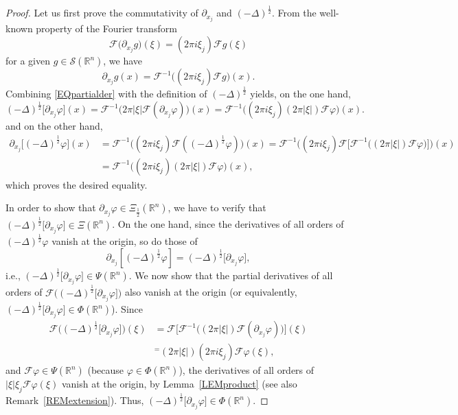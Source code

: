 \documentclass[reqno,11pt]{amsart}
\theoremstyle{definition}
\def\R{\mathbb{R}}
\begin{document}
\begin{proof}
	Let us first prove the commutativity of $\partial_{x_j}$ and $(-\Delta)^{\frac{1}{2}}$. From the well-known property of the Fourier transform
	\[
	\mathcal{F} \big(\partial_{x_j}g\big)(\xi) = (2\pi i \xi_j)\mathcal{F}g(\xi)
	\] for a given $g\in \mathcal{S}(\R^n)$, we have
	\begin{equation}
		\label{EQpartialder}
		\partial_{x_j}g(x) = \mathcal{F}^{-1}\big( (2\pi i \xi_j) \mathcal{F}g\big)(x).
	\end{equation}
	Combining \eqref{EQpartialder} with the definition of $(-\Delta)^\frac{1}{2}$ yields, on the one hand,
	\[
	(-\Delta)^{\frac{1}{2}}\big[\partial_{x_j}\varphi\big](x) = \mathcal{F}^{-1}\big(2 \pi |\xi| \mathcal{F}(\partial_{x_j}\varphi)\big)(x) = \mathcal{F}^{-1}\big( (2\pi i \xi_j)(2 \pi |\xi|)  \mathcal{F}\varphi\big)(x).
	\]
	and on the other hand,
	\begin{align*}
		\partial_{x_j}\big[(-\Delta)^{\frac{1}{2}}\varphi\big](x)&=\mathcal{F}^{-1}\big( (2\pi i \xi_j) \mathcal{F}((-\Delta)^{\frac{1}{2}}\varphi)\big)(x) = \mathcal{F}^{-1}\big( (2\pi i \xi_j) \mathcal{F}\big[\mathcal{F}^{-1}\big( (2 \pi |\xi|) \mathcal{F}\varphi \big)\big]\big)(x)\\
		&= \mathcal{F}^{-1}\big( (2\pi i \xi_j) (2 \pi |\xi|)\mathcal{F}\varphi \big)(x),
	\end{align*}
	which proves the desired equality.
	
	In order to show that $\partial_{x_j} \varphi\in \Xi_{{\frac{1}{2}}}(\R^n)$, we have to verify that $(-\Delta)^{\frac{1}{2}}\big[\partial_{x_j}\varphi\big]  \in \Xi(\R^n)$. On the one hand, since the derivatives of all orders of $(-\Delta)^{\frac{1}{2}} \varphi$ vanish at the origin, so do those of
\[
\partial_{x_j}[ (-\Delta)^{\frac{1}{2}} \varphi]=(-\Delta)^{\frac{1}{2}}\big[\partial_{x_j}\varphi\big],
\]
 i.e., $(-\Delta)^{\frac{1}{2}}\big[\partial_{x_j}\varphi\big]\in \Psi(\R^n)$. We now show that the partial derivatives of all orders of $\mathcal{F}\big((-\Delta)^{\frac{1}{2}}\big[\partial_{x_j}\varphi\big]\big)$ also vanish at the origin (or equivalently, $(-\Delta)^{\frac{1}{2}}\big[\partial_{x_j}\varphi\big]\in \Phi(\R^n)$). Since
	\begin{align*}
		\mathcal{F}\big( (-\Delta)^{\frac{1}{2}}\big[\partial_{x_j}\varphi\big]\big)(\xi)& = \mathcal{F}\big[\mathcal{F}^{-1}\big( (2 \pi |\xi|) \mathcal{F}(\partial_{x_j}\varphi)\big)\big](\xi)\\
		&^ =  (2 \pi |\xi|)(2\pi i \xi_j) \mathcal{F}\varphi(\xi),
	\end{align*}
	and  $\mathcal{F}\varphi\in \Psi(\R^n)$ (because $\varphi\in \Phi(\R^n)$), the derivatives of all orders of $|\xi|\xi_j\mathcal{F}\varphi(\xi)$ vanish at the origin, by Lemma~\ref{LEMproduct} (see also Remark~\ref{REMextension}). Thus, $(-\Delta)^{\frac{1}{2}}\big[\partial_{x_j}\varphi\big]\in \Phi(\R^n)$.
\end{proof}
\end{document}
